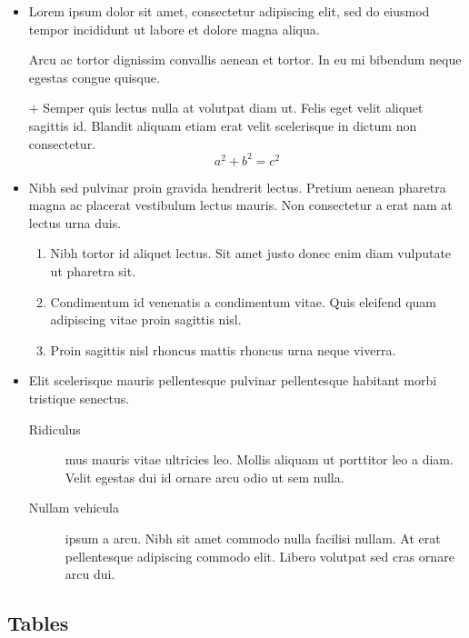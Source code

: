 \documentclass[a4paper, 12pt]{report}
\begin{document}
    \begin{itemize}[leftmargin=*]
        \item Lorem ipsum dolor sit amet, consectetur adipiscing elit, sed do eiusmod tempor incididunt ut labore et dolore magna aliqua.

        Arcu ac tortor dignissim convallis aenean et tortor. In eu mi bibendum neque egestas congue quisque.

        \item[$+$] Semper quis lectus nulla at volutpat diam ut. Felis eget velit aliquet sagittis id. Blandit aliquam etiam erat velit scelerisque in dictum non consectetur.
        \begin{equation}
            a^2 + b^2 = c^2
        \end{equation}

        \item Nibh sed pulvinar proin gravida hendrerit lectus. Pretium aenean pharetra magna ac placerat vestibulum lectus mauris. Non consectetur a erat nam at lectus urna duis.
        \begin{enumerate}[noitemsep, label=\roman*.]
            \item Nibh tortor id aliquet lectus. Sit amet justo donec enim diam vulputate ut pharetra sit.
            \setcounter{enumi}{3}
            \item Condimentum id venenatis a condimentum vitae. Quis eleifend quam adipiscing vitae proin sagittis nisl.
            \addtocounter{enumi}{15}
            \item Proin sagittis nisl rhoncus mattis rhoncus urna neque viverra.
        \end{enumerate}

        \item Elit scelerisque mauris pellentesque pulvinar pellentesque habitant morbi tristique senectus.
            \begin{description}
                \item[Ridiculus] mus mauris vitae ultricies leo. Mollis aliquam ut porttitor leo a diam. Velit egestas dui id ornare arcu odio ut sem nulla.
                \item[Nullam vehicula] ipsum a arcu. Nibh sit amet commodo nulla facilisi nullam. At erat pellentesque adipiscing commodo elit. Libero volutpat sed cras ornare arcu dui.
            \end{description}
    \end{itemize}

    \subsection{Tables}
\end{document}
